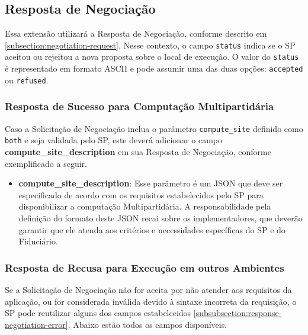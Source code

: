 \subsection{Resposta de Negociação}

Essa extensão utilizará a Resposta de Negociação, conforme descrito em \autoref{subsection:negotiation-request}. Nesse contexto, o campo \texttt{status} indica se o \acs{SP} aceitou ou rejeitou a nova proposta sobre o local de execução. O valor do \texttt{status} é representado em formato ASCII e pode assumir uma das duas opções: \texttt{accepted} ou \texttt{refused}.



\subsubsection{Resposta de Sucesso para Computação Multipartidária}

Caso a Solicitação de Negociação inclua o parâmetro \texttt{compute\_site} definido como \texttt{both} e seja validada pelo \acs{SP}, este deverá adicionar o campo \textbf{compute\_site\_description} em sua Resposta de Negociação, conforme exemplificado a seguir.



\begin{itemize}
    \item \textbf{compute\_site\_description}: Esse parâmetro é um \acs{JSON} que deve ser especificado de acordo com os requisitos estabelecidos pelo \acs{SP} para disponibilizar a computação Multipartidária. A responsabilidade pela definição do formato deste \acs{JSON} recai sobre os implementadores, que deverão garantir que ele atenda aos critérios e necessidades específicas do \acs{SP} e do Fiduciário.
\end{itemize}

\subsubsection{Resposta de Recusa para Execução em outros Ambientes}

Se a Solicitação de Negociação não for aceita por não atender aos requisitos da aplicação, ou for considerada inválida devido à sintaxe incorreta da requisição, o \acs{SP} pode reutilizar alguns dos campos estabelecidos \autoref{subsubsection:response-negotiation-error}. Abaixo estão todos os campos disponíveis.

